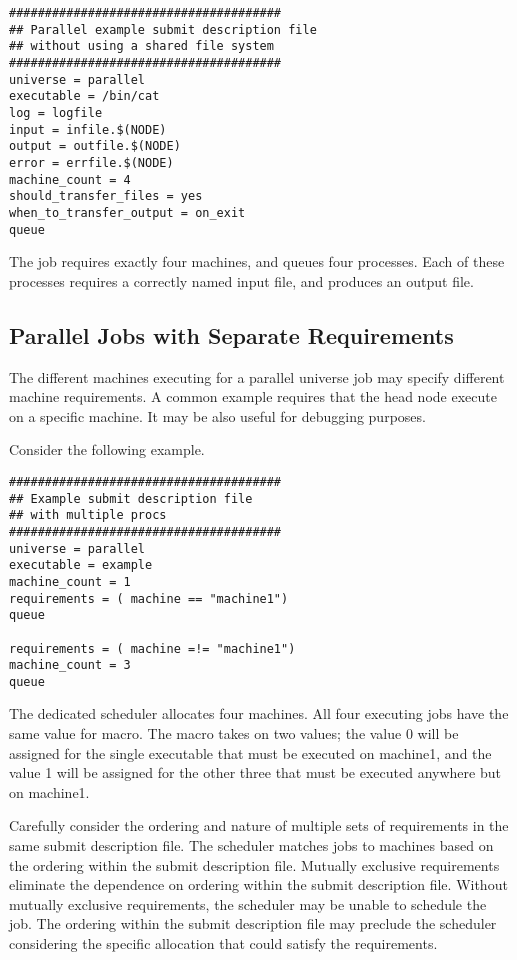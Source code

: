 \begin{verbatim}
######################################
## Parallel example submit description file
## without using a shared file system
######################################
universe = parallel
executable = /bin/cat
log = logfile
input = infile.$(NODE)
output = outfile.$(NODE)
error = errfile.$(NODE)
machine_count = 4
should_transfer_files = yes
when_to_transfer_output = on_exit
queue
\end{verbatim}

The job requires exactly four machines,
and queues four processes.
Each of these processes requires a correctly named input file,
and produces an output file.

\subsection{\label{sec:parallel-multi-proc}Parallel Jobs with Separate Requirements}

The different machines executing for a parallel universe job
may specify different machine requirements.
A common example requires that the
head node execute on a specific machine.
It may be also useful for debugging purposes.

Consider the following example.

\begin{verbatim}
######################################
## Example submit description file
## with multiple procs
######################################
universe = parallel
executable = example
machine_count = 1
requirements = ( machine == "machine1")
queue

requirements = ( machine =!= "machine1")
machine_count = 3
queue
\end{verbatim}

The dedicated scheduler allocates four machines.
All four executing jobs have the same value for 
macro.
The  macro takes on two values;
the value 0 will be assigned for the single executable
that must be executed on machine1, and
the value 1 will be assigned for the other three 
that must be executed anywhere but on machine1.

Carefully consider the ordering and nature of multiple
sets of requirements in the same submit description file.
The scheduler matches jobs to machines based on the ordering
within the submit description file.
Mutually exclusive requirements eliminate the dependence on
ordering within the submit description file.
Without mutually exclusive requirements,
the scheduler may be unable to schedule the job.
The ordering within the submit description file may preclude
the scheduler considering the specific allocation that
could satisfy the requirements.


